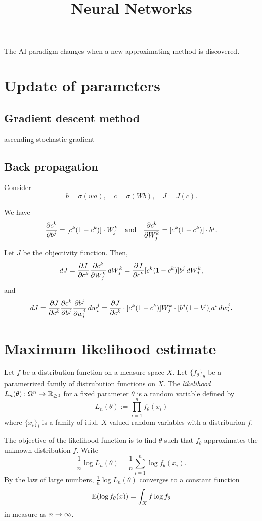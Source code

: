 \documentclass{../exp}
\title{Neural Networks}
\begin{document}
\maketitle

The AI paradigm changes when a new approximating method is discovered.




\section{Update of parameters}

\subsection{Gradient descent method}
ascending stochastic gradient


\subsection{Back propagation}
Consider
\[b=\sigma(wa),\quad c=\sigma(Wb),\quad J=J(c).\]

We have
\[\pd{c^k}{b^j}=[c^k(1-c^k)]\cdot W_j^k\quad\text{and}\quad\pd{c^k}{W_j^k}=[c^k(1-c^k)]\cdot b^j.\]

Let $J$ be the objectivity function.
Then,
\[dJ=\pd{J}{c^k}\pd{c^k}{W_j^k}\,dW_j^k=\pd{J}{c^k}[c^k(1-c^k)]b^j\,dW_j^k,\]
and
\[dJ=\pd{J}{c^k}\pd{c^k}{b^j}\pd{b^j}{w_i^j}\,dw_i^j=\pd{J}{c^k}\cdot[c^k(1-c^k)]W_j^k\cdot[b^j(1-b^j)]a^i\,dw_i^j.\]



\section{Maximum likelihood estimate}
\begin{defn}
Let $f$ be a distribution function on a measure space $X$.
Let $\{f_\theta\}_\theta$ be a parametrized family of distrubution functions on $X$.
The \emph{likelihood} $L_n(\theta):\Omega^n\to\R_{\ge0}$ for a fixed parameter $\theta$ is a random variable defined by
\[L_n(\theta):=\prod_{i=1}^nf_\theta(x_i)\]
where $\{x_i\}_i$ is a family of i.i.d. $X$-valued random variables with a distriburion $f$.
\end{defn}
The objective of the likelihood function is to find $\theta$ such that $f_\theta$ approximates the unknown distribution $f$.
Write
\[\frac1n\log L_n(\theta)=\frac1n\sum_{i=1}^n\log f_\theta(x_i).\]
By the law of large numbers, $\frac1n\log L_n(\theta)$ converges to a constant function
\[\mathbb{E}(\log f_\theta(x))=\int_Xf\log f_\theta\]
in measure as $n\to\oo$.
\end{document}
